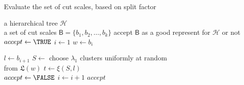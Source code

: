 %
%
%
%
%
%
\begin{algorithm}[h!]
\caption{Evaluate the set of cut scales, based on split factor}\label{alg:evaluate}
\begin{algorithmic}[1]
	\REQUIRE a hierarchical tree $\mathcal{H}$ \AND \\
             \hspace{8 mm} a set of cut scales $\textit{$\mathsf{B}$} = \{b_1, b_2, \ldots, b_k\}$
	\ENSURE accept \textit{$\mathsf{B}$} as a good represent for $\mathcal{H}$ or not
	\medskip
	\STATE $accept \leftarrow \TRUE$ 
	\STATE $i \leftarrow 1$
		\vspace{1.4mm}
		\STATE $w \leftarrow b_i$

		\STATE $l \leftarrow b_{i+1}$
		\vspace{1.6mm}
		\STATE $ S \leftarrow$ choose $\lambda_1$ clusters uniformly at random \\
								\hspace{8mm} from $\mathfrak{L}$$(w)$
		\vspace{1.6mm}
		\STATE $t \leftarrow \xi(S,l)$ \\
		\vspace{1.6mm}
			\vspace{1.3mm}	
			\STATE $accept \leftarrow \FALSE$ 
		\ENDIF
		\vspace{1.5mm}
		\STATE $i \leftarrow i+1$\;	
	\ENDWHILE
	\vspace{1.5mm}
	\RETURN $accept$
\end{algorithmic}
\end{algorithm}
